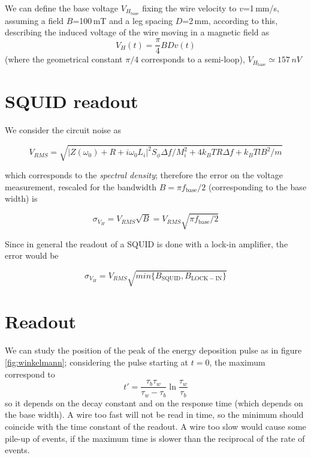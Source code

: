 \documentclass[a4paper,12pt]{article}
\begin{document}
We can define the base voltage $V_{H_{\mathrm{base}}}$ fixing the wire velocity to $v$=1\,mm/s, assuming a field $B$=100\,mT and a leg spacing $D$=2\,mm, according to this, describing the induced voltage of the wire moving in a magnetic field as
\begin{equation}
V_H(t) = \frac{\pi}{4} B D v(t)
\end{equation}
(where the geometrical constant $\pi/4$ corresponds to a semi-loop), $V_{H_{\mathrm{base}}} \simeq 157\,nV$ 


\section{SQUID readout}
We consider the circuit noise as

\begin{equation}
V_{RMS}  = \sqrt{\big|Z(\omega_0) + R + i\omega_0 L_i\big|^2 S_\phi \Delta f / M_i^2 + 4 k_B T R \Delta f + k_B T l B^2 / m}
\end{equation}

which corresponds to the \textit{spectral density}; therefore the error on the voltage measurement, rescaled for the bandwidth $B = \pi f_\mathrm{base}/2$ (corresponding to the base width) is

\begin{equation}
  \sigma_{V_H} = V_{RMS}\sqrt{B} = V_{RMS}\sqrt{\pi f_\mathrm{base}/2}
\end{equation}

Since in general the readout of a SQUID is done with a lock-in amplifier, the error would be

\begin{equation}
  \sigma_{V_H} = V_{RMS}\sqrt{min\{B_\mathrm{SQUID},B_\mathrm{LOCK-IN}\}}
\end{equation}




\section{Readout}

We can study the position of the peak of the energy deposition pulse as in figure \ref{fig:winkelmann}; considering the pulse starting at $t=0$, the maximum correspond to
\begin{equation}
t' = \frac{\tau_b \tau_w}{\tau_w - \tau_b} \ln \frac{\tau_w}{\tau_b}
\end{equation}
so it depends on the decay constant and on the response time (which depends on the base width).
A wire too fast will not be read in time, so the minimum should coincide with the time constant of the readout.
A wire too slow would cause some pile-up of events, if the maximum time is slower than the reciprocal of the rate of events.
\end{document}
